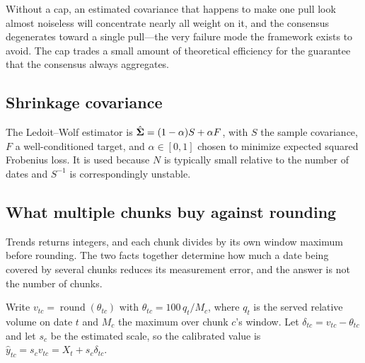 \documentclass[12pt,a4paper,oneside]{article}
\begin{document}
\begin{remark}
Without a cap, an estimated covariance that happens to make one pull look almost
noiseless will concentrate nearly all weight on it, and the consensus degenerates
toward a single pull---the very failure mode the framework exists to avoid. The
cap trades a small amount of theoretical efficiency for the guarantee that the
consensus always aggregates.
\end{remark}

\subsection{Shrinkage covariance}

The Ledoit--Wolf estimator is
$\hat{\bm{\Sigma}}=(1-\alpha)S+\alpha F$, with $S$ the sample covariance, $F$ a
well-conditioned target, and $\alpha\in[0,1]$ chosen to minimize expected
squared Frobenius loss. It is used because $N$ is typically small relative to
the number of dates and $S^{-1}$ is correspondingly unstable.

\subsection{What multiple chunks buy against rounding}\label{app:rounding}

Trends returns integers, and each chunk divides by its own window maximum before
rounding. The two facts together determine how much a date being covered by
several chunks reduces its measurement error, and the answer is not the number of
chunks.

Write $v_{tc}=\operatorname{round}(\theta_{tc})$ with $\theta_{tc}=100\,q_t/M_c$,
where $q_t$ is the served relative volume on date $t$ and $M_c$ the maximum over
chunk $c$'s window. Let $\delta_{tc}=v_{tc}-\theta_{tc}$ and let $s_c$ be the
estimated scale, so the calibrated value is
$\hat{y}_{tc}=s_c v_{tc}=X_t+s_c\delta_{tc}$.
\end{document}

